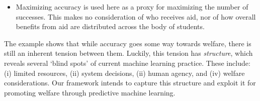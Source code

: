\begin{itemize}[leftmargin=1em,topsep=0em,itemsep=0.2em]
\item 
Maximizing accuracy is used here as a proxy for maximizing the number of successes.
This makes no consideration of who receives aid, nor of how overall benefits from aid are distributed across the body of students.


\squeeze

\end{itemize}

The example shows that while accuracy goes some way towards welfare,
there is still an inherent tension between them.
Luckily, this tension has \emph{structure}, 
which reveals several `blind spots' of current machine learning practice.
These include:
(i) limited resources,
(ii) system decisions,
(ii) human agency,
and (iv) welfare considerations.
Our framework intends to capture this structure and exploit it for
promoting welfare through predictive machine learning.




